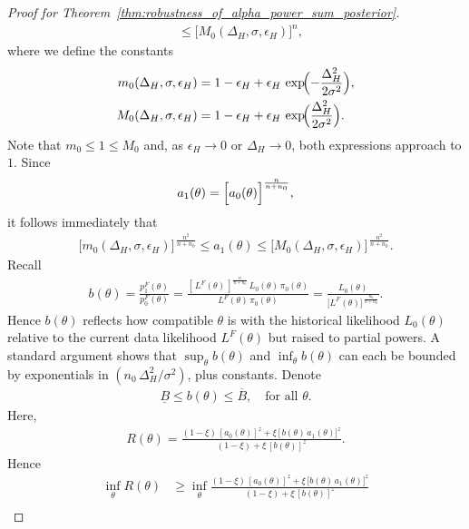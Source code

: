 \documentclass[12pt]{article}
\begin{document}
\begin{proof}[Proof for Theorem~\ref{thm:robustness_of_alpha_power_sum_posterior}]
\begin{align*}
         &\leq  \bigl[M_0(\Delta_H,\sigma,\epsilon_H)\bigr]^n,
    \end{align*}
    where we define the constants
    \begin{align*}
        m_0(\Delta_H,\sigma,\epsilon_H) &= 1 - \epsilon_H + \epsilon_H\,\exp\!\Bigl(-\frac{\Delta_H^2}{2\sigma^2}\Bigr), \\
        M_0(\Delta_H,\sigma,\epsilon_H) &=  1 - \epsilon_H + \epsilon_H\,\exp\!\Bigl(\frac{\Delta_H^2}{2\sigma^2}\Bigr).
    \end{align*}
    Note that $m_0\le1\le M_0$ and, as $\epsilon_H\to0$ or $\Delta_H\to0$, both expressions approach to $1$.
    Since
    \begin{align*}
         a_1(\theta) = \Bigl[a_0(\theta)\Bigr]^{\frac{n}{n+n_0}},
    \end{align*}
    it follows immediately that
    \begin{align*}
        \bigl[m_0(\Delta_H,\sigma,\epsilon_H)\bigr]^{\,\frac{n^2}{n+n_0}} \leq a_1(\theta) \leq  \bigl[M_0(\Delta_H,\sigma,\epsilon_H)\bigr]^{\,\frac{n^2}{n+n_0}}.
    \end{align*}
    Recall
    \begin{align*}
        b(\theta) = \frac{p_1^F(\theta)}{p_0^F(\theta)} = \frac{[\,L^F(\theta)\,]^{\frac{n}{n+n_0}}\,L_0(\theta)\,\pi_0(\theta)}{L^F(\theta)\,\pi_0(\theta)} = \frac{L_0(\theta)}{\bigl[L^F(\theta)\bigr]^{\,\frac{n_0}{n+n_0}}}.
    \end{align*}
    Hence $b(\theta)$ reflects how compatible $\theta$ is with the historical likelihood $L_0(\theta)$ relative to the current data likelihood $L^F(\theta)$ but raised to partial powers. 
    A standard argument shows that $\sup_\theta b(\theta)$ and $\inf_\theta b(\theta)$ can each be bounded by exponentials in $(n_0\,\Delta_H^2/\sigma^2)$, plus constants.
    Denote
    \begin{align*}
        \underline{B} \leq b(\theta) \leq \overline{B}, \quad \text{for all }\theta.
    \end{align*}
    Here,
    \begin{align*}
        R(\theta) = \frac{(1-\xi)\,[a_0(\theta)]^z + \xi\,[\,b(\theta)\,a_1(\theta)\bigr]^z}{(1-\xi) + \xi\,[b(\theta)]^z}.
    \end{align*}
    Hence
    \begin{align*}
        \inf_\theta R(\theta) &\geq \inf_\theta \frac{(1-\xi)\,[a_0(\theta)]^z + \xi\,\bigl[b(\theta)\,a_1(\theta)\bigr]^z}{(1-\xi) + \xi\,[b(\theta)]^z} \\

\end{align*}
\end{proof}
\end{document}
